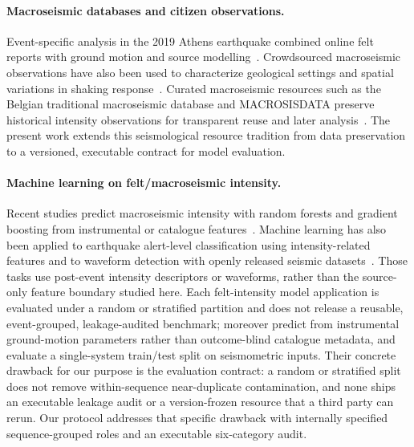 \documentclass[pdflatex,sn-basic,iicol]{sn-jnl}
\begin{document}
\paragraph{Macroseismic databases and citizen observations.} Event-specific
analysis in the 2019 Athens earthquake combined online felt reports with ground
motion and source modelling~\citep{kouskouna2021athens}. Crowdsourced
macroseismic observations have also been used to characterize geological
settings and spatial variations in shaking response~\citep{sarao2023crowdsourcing}.
Curated macroseismic
resources such as the Belgian traditional macroseismic database and
MACROSISDATA preserve historical intensity observations for transparent reuse
and later analysis~\citep{neefs2025btm,sira2025macrosisdata}. The present work
extends this seismological resource tradition from data preservation to a
versioned, executable contract for model evaluation.

\paragraph{Machine learning on felt/macroseismic intensity.} Recent studies
predict macroseismic intensity with random forests and gradient boosting from
instrumental or catalogue features~\citep{patelli2026macroseismic,
mori2025explainable}. Machine learning has also been applied to earthquake
alert-level classification using intensity-related features and to waveform
detection with openly released seismic datasets~\citep{ozupak2026alert,
ertuncay2025detection}. Those tasks use post-event intensity descriptors or
waveforms, rather than the source-only feature boundary studied here. Each
felt-intensity model application is evaluated under a
random or stratified partition and does not release a reusable, event-grouped,
leakage-audited benchmark; \citet{mori2025explainable} moreover predict from
instrumental ground-motion parameters rather than outcome-blind catalogue
metadata, and \citet{patelli2026macroseismic} evaluate a single-system
train/test split on seismometric inputs. Their concrete drawback for our purpose
is the evaluation contract: a random or stratified split does not remove
within-sequence near-duplicate contamination, and none ships an executable
leakage audit or a version-frozen resource that a third party can rerun.
Our protocol addresses that specific drawback with internally specified sequence-grouped
roles and an executable six-category audit.
\end{document}

